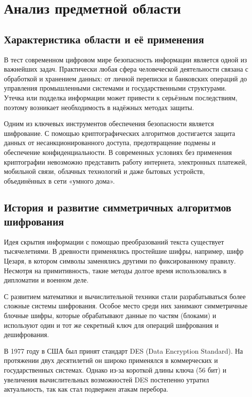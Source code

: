 \section{Анализ предметной области}
\subsection{Характеристика области и её применения}

В тест современном цифровом мире безопасность информации является одной из важнейших задач. Практически любая сфера человеческой деятельности связана с обработкой и хранением данных: от личной переписки и банковских операций до управления промышленными системами и государственными структурами. Утечка или подделка информации может привести к серьёзным последствиям, поэтому возникает необходимость в надёжных методах защиты.  

Одним из ключевых инструментов обеспечения безопасности является шифрование. С помощью криптографических алгоритмов достигается защита данных от несанкционированного доступа, предотвращение подмены и обеспечение конфиденциальности. В современных условиях без применения криптографии невозможно представить работу интернета, электронных платежей, мобильной связи, облачных технологий и даже бытовых устройств, объединённых в сети «умного дома».  

\subsection{История и развитие симметричных алгоритмов шифрования}

Идея скрытия информации с помощью преобразований текста существует тысячелетиями. В древности применялись простейшие шифры, например, шифр Цезаря, в котором символы заменялись другими по фиксированному правилу. Несмотря на примитивность, такие методы долгое время использовались в дипломатии и военном деле.  

С развитием математики и вычислительной техники стали разрабатываться более сложные системы шифрования. Особое место среди них занимают симметричные блочные шифры, которые обрабатывают данные по частям (блоками) и используют один и тот же секретный ключ для операций шифрования и дешифрования.  

В 1977 году в США был принят стандарт DES (Data Encryption Standard). На протяжении двух десятилетий он широко применялся в коммерческих и государственных системах. Однако из-за короткой длины ключа (56 бит) и увеличения вычислительных возможностей DES постепенно утратил актуальность, так как стал подвержен атакам перебора.  

